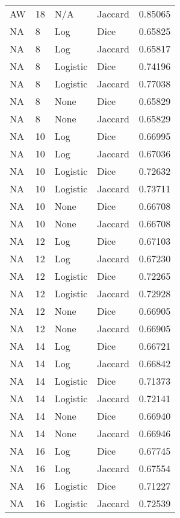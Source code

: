 \documentclass{article}
\begin{document}
\begin{center}
\begin{supertabular}{| l | l | l | l | l |}
               AW & 18 & N/A & Jaccard & 0.85065 \\
               NA & 8 & Log & Dice & 0.65825 \\
               NA & 8 & Log & Jaccard & 0.65817 \\
               NA & 8 & Logistic & Dice & 0.74196 \\
               NA & 8 & Logistic & Jaccard & 0.77038 \\
               NA & 8 & None & Dice & 0.65829 \\
               NA & 8 & None & Jaccard & 0.65829 \\
               NA & 10 & Log & Dice & 0.66995 \\
               NA & 10 & Log & Jaccard & 0.67036 \\
               NA & 10 & Logistic & Dice & 0.72632 \\
               NA & 10 & Logistic & Jaccard & 0.73711 \\
               NA & 10 & None & Dice & 0.66708 \\
               NA & 10 & None & Jaccard & 0.66708 \\
               NA & 12 & Log & Dice & 0.67103 \\
               NA & 12 & Log & Jaccard & 0.67230 \\
               NA & 12 & Logistic & Dice & 0.72265 \\
               NA & 12 & Logistic & Jaccard & 0.72928 \\
               NA & 12 & None & Dice & 0.66905 \\
               NA & 12 & None & Jaccard & 0.66905 \\
               NA & 14 & Log & Dice & 0.66721 \\
               NA & 14 & Log & Jaccard & 0.66842 \\
               NA & 14 & Logistic & Dice & 0.71373 \\
               NA & 14 & Logistic & Jaccard & 0.72141 \\
               NA & 14 & None & Dice & 0.66940 \\
               NA & 14 & None & Jaccard & 0.66946 \\
               NA & 16 & Log & Dice & 0.67745 \\
               NA & 16 & Log & Jaccard & 0.67554 \\
               NA & 16 & Logistic & Dice & 0.71227 \\
               NA & 16 & Logistic & Jaccard & 0.72539 \\

\end{supertabular}
\end{center}
\end{document}
